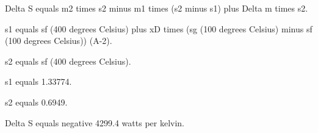 Delta S equals m2 times s2 minus m1 times (s2 minus s1) plus Delta m times s2.  

s1 equals sf (400 degrees Celsius) plus xD times (sg (100 degrees Celsius) minus sf (100 degrees Celsius)) (A-2).  

s2 equals sf (400 degrees Celsius).  

s1 equals 1.33774.  

s2 equals 0.6949.  

Delta S equals negative 4299.4 watts per kelvin.